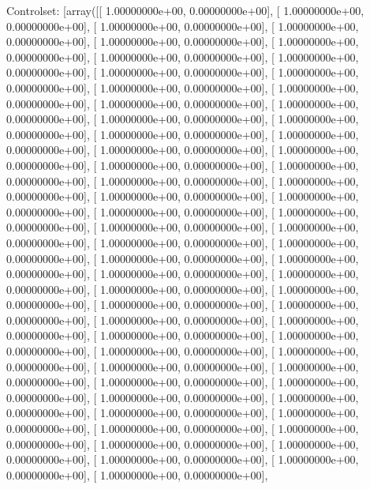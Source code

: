 \documentclass{article}
\begin{document}
Controlset: [array([[ 1.00000000e+00,  0.00000000e+00],
       [ 1.00000000e+00,  0.00000000e+00],
       [ 1.00000000e+00,  0.00000000e+00],
       [ 1.00000000e+00,  0.00000000e+00],
       [ 1.00000000e+00,  0.00000000e+00],
       [ 1.00000000e+00,  0.00000000e+00],
       [ 1.00000000e+00,  0.00000000e+00],
       [ 1.00000000e+00,  0.00000000e+00],
       [ 1.00000000e+00,  0.00000000e+00],
       [ 1.00000000e+00,  0.00000000e+00],
       [ 1.00000000e+00,  0.00000000e+00],
       [ 1.00000000e+00,  0.00000000e+00],
       [ 1.00000000e+00,  0.00000000e+00],
       [ 1.00000000e+00,  0.00000000e+00],
       [ 1.00000000e+00,  0.00000000e+00],
       [ 1.00000000e+00,  0.00000000e+00],
       [ 1.00000000e+00,  0.00000000e+00],
       [ 1.00000000e+00,  0.00000000e+00],
       [ 1.00000000e+00,  0.00000000e+00],
       [ 1.00000000e+00,  0.00000000e+00],
       [ 1.00000000e+00,  0.00000000e+00],
       [ 1.00000000e+00,  0.00000000e+00],
       [ 1.00000000e+00,  0.00000000e+00],
       [ 1.00000000e+00,  0.00000000e+00],
       [ 1.00000000e+00,  0.00000000e+00],
       [ 1.00000000e+00,  0.00000000e+00],
       [ 1.00000000e+00,  0.00000000e+00],
       [ 1.00000000e+00,  0.00000000e+00],
       [ 1.00000000e+00,  0.00000000e+00],
       [ 1.00000000e+00,  0.00000000e+00],
       [ 1.00000000e+00,  0.00000000e+00],
       [ 1.00000000e+00,  0.00000000e+00],
       [ 1.00000000e+00,  0.00000000e+00],
       [ 1.00000000e+00,  0.00000000e+00],
       [ 1.00000000e+00,  0.00000000e+00],
       [ 1.00000000e+00,  0.00000000e+00],
       [ 1.00000000e+00,  0.00000000e+00],
       [ 1.00000000e+00,  0.00000000e+00],
       [ 1.00000000e+00,  0.00000000e+00],
       [ 1.00000000e+00,  0.00000000e+00],
       [ 1.00000000e+00,  0.00000000e+00],
       [ 1.00000000e+00,  0.00000000e+00],
       [ 1.00000000e+00,  0.00000000e+00],
       [ 1.00000000e+00,  0.00000000e+00],
       [ 1.00000000e+00,  0.00000000e+00],
       [ 1.00000000e+00,  0.00000000e+00],
       [ 1.00000000e+00,  0.00000000e+00],
       [ 1.00000000e+00,  0.00000000e+00],
       [ 1.00000000e+00,  0.00000000e+00],
       [ 1.00000000e+00,  0.00000000e+00],
       [ 1.00000000e+00,  0.00000000e+00],
       [ 1.00000000e+00,  0.00000000e+00],
       [ 1.00000000e+00,  0.00000000e+00],
       [ 1.00000000e+00,  0.00000000e+00],
       [ 1.00000000e+00,  0.00000000e+00],
       [ 1.00000000e+00,  0.00000000e+00],
       [ 1.00000000e+00,  0.00000000e+00],
       [ 1.00000000e+00,  0.00000000e+00],
       [ 1.00000000e+00,  0.00000000e+00],
       [ 1.00000000e+00,  0.00000000e+00],
       [ 1.00000000e+00,  0.00000000e+00],
\end{document}
